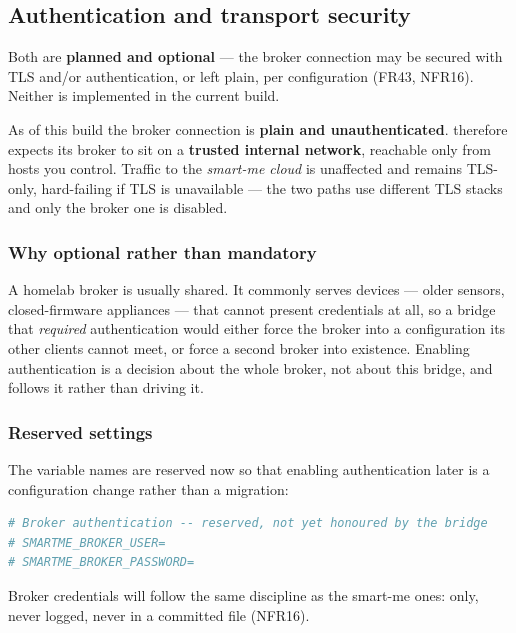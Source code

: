 \subsection{Authentication and transport security}

Both are \textbf{planned and optional} --- the broker connection may be secured with TLS
and/or authentication, or left plain, per configuration (FR43, NFR16). Neither is
implemented in the current build.

\begin{warning}
As of this build the broker connection is \textbf{plain and unauthenticated}. \prog
therefore expects its broker to sit on a \textbf{trusted internal network}, reachable only
from hosts you control. Traffic to the \emph{smart-me cloud} is unaffected and remains
TLS-only, hard-failing if TLS is unavailable --- the two paths use different TLS stacks
and only the broker one is disabled.
\end{warning}

\subsubsection*{Why optional rather than mandatory}

A homelab broker is usually shared. It commonly serves devices --- older sensors,
closed-firmware appliances --- that cannot present credentials at all, so a bridge that
\emph{required} authentication would either force the broker into a configuration its
other clients cannot meet, or force a second broker into existence. Enabling
authentication is a decision about the whole broker, not about this bridge, and \prog
follows it rather than driving it.

\subsubsection*{Reserved settings}

The variable names are reserved now so that enabling authentication later is a
configuration change rather than a migration:

\begin{lstlisting}[language=bash]
# Broker authentication -- reserved, not yet honoured by the bridge
# SMARTME_BROKER_USER=
# SMARTME_BROKER_PASSWORD=
\end{lstlisting}

\begin{note}
Broker credentials will follow the same discipline as the smart-me ones:  only,
never logged, never in a committed file (NFR16).
\end{note}

